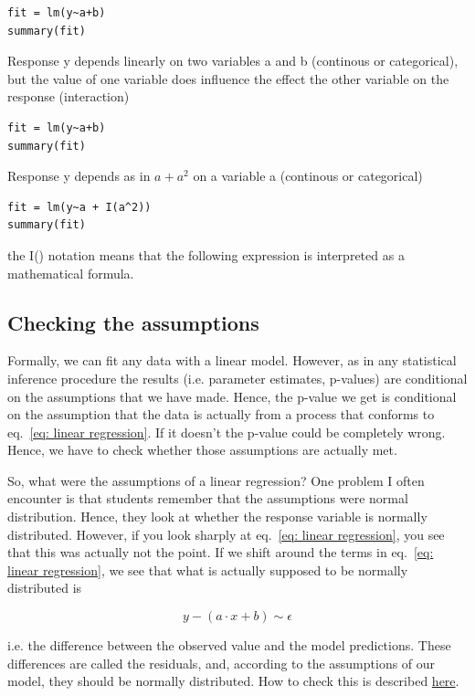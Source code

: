 \documentclass[a4paper,twoside]{tufte-book} %
\begin{document}
\begin{lstlisting}
fit = lm(y~a+b)
summary(fit)
\end{lstlisting}

Response y depends linearly on two variables a and b (continous or categorical), but the value of one variable does influence the effect the other variable on the response (interaction)

\begin{lstlisting}
fit = lm(y~a+b)
summary(fit)
\end{lstlisting}

Response y depends as in $a + a^2$ on a variable a (continous or categorical)

\begin{lstlisting}
fit = lm(y~a + I(a^2))
summary(fit)
\end{lstlisting}

the I() notation means that the following expression is interpreted as a mathematical formula. 



\subsection{Checking the assumptions}

Formally, we can fit any data with a linear model. However, as in any statistical inference procedure the results (i.e. parameter estimates, p-values) are conditional on the assumptions that we have made. Hence, the p-value we get is conditional on the assumption that the data is actually from a process that conforms to eq.~\ref{eq: linear regression}. If it doesn't the p-value could be completely wrong. Hence, we have to check whether those assumptions are actually met. 

So, what were the assumptions of a linear regression? One problem I often encounter is that students remember that the assumptions were normal distribution. Hence, they look at whether the response variable is normally distributed. However, if you look sharply at eq.~\ref{eq: linear regression}, you see that this was actually not the point. If we shift around the terms in eq.~\ref{eq: linear regression}, we see that what is actually supposed to be normally distributed is 

\begin{equation} \label{eq: linear regression}
y - (a \cdot x + b ) \sim \epsilon 
\end{equation}

i.e. the difference between the observed value and the model predictions. These differences are called the residuals, and, according to the assumptions of our model, they should be normally distributed. How to check this is described \href{http://www.statmethods.net/stats/rdiagnostics.html}{here}.
\end{document}
